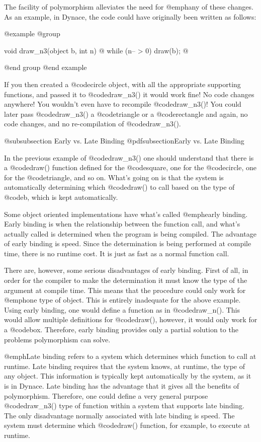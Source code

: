 The facility of polymorphism alleviates the need for @emph{any} of these
changes.  As an example, in Dynace, the code could have originally been
written as follows:

@example
@group

void    draw_n3(object b, int n)
@{
        while (n-- > 0)
                draw(b);
@}

@end group
@end example

If you then created a @code{circle} object, with all the appropriate supporting
functions, and passed it to @code{draw_n3()} it would work fine!  No code
changes anywhere!  You wouldn't even have to recompile @code{draw_n3()}!
You could later pass @code{draw_n3()} a @code{triangle} or a @code{rectangle}
and again, no code changes, and no re-compilation of @code{draw_n3()}.

@subsubsection Early vs. Late Binding
@pdfsubsection{Early vs. Late Binding}

In the previous example of @code{draw_n3()} one should understand that
there is a @code{draw()} function defined for the @code{square}, one for the
@code{circle}, one for the @code{triangle}, and so on.  What's going on is that
the system is automatically determining which @code{draw()} to call based
on the type of @code{b}, which is kept automatically.

Some object oriented implementations have what's called @emph{early binding}.
Early binding is when the relationship between the function call, and
what's actually called is determined when the program is being compiled.
The advantage of early binding is speed.  Since the determination is being
performed at compile time, there is no runtime cost.  It is just as fast
as a normal function call.

There are, however, some serious disadvantages of early binding.  First
of all, in order for the compiler to make the determination it must know
the type of the argument at compile time.  This means that the procedure
could only work for @emph{one} type of object.  This is entirely
inadequate for the above example.  Using early binding, one would
define a function as in @code{draw_n()}.  This would allow multiple
definitions for @code{draw()}, however, it would only work for a
@code{box}.  Therefore, early binding provides only a partial solution to
the problems polymorphism can solve.

@emph{Late binding} refers to a system which determines which function
to call at runtime.  Late binding requires that the system knows, at
runtime, the type of any object.  This information is typically kept
automatically by the system, as it is in Dynace.  Late binding has the advantage
that it gives all the benefits of polymorphism.  Therefore, one could
define a very general purpose @code{draw_n3()} type of function within a system
that supports late binding.  The only disadvantage normally associated
with late binding is speed. The system must determine which
@code{draw()} function, for example, to execute at runtime.

